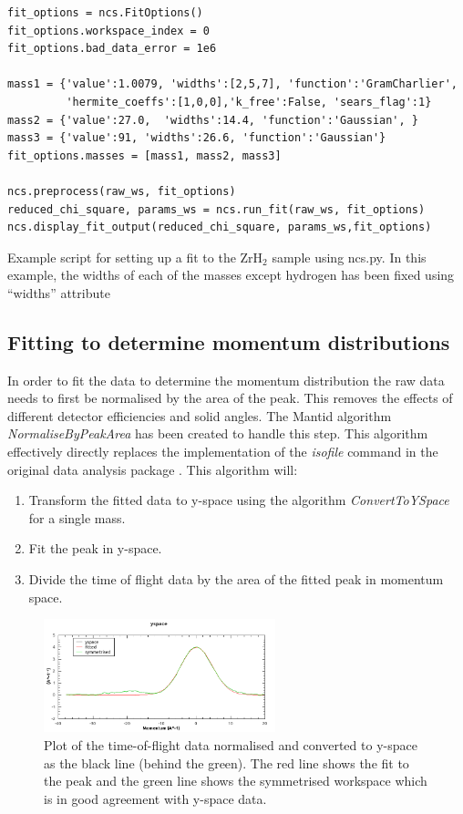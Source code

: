 \documentclass[paper=a4, fontsize=11pt]{scrartcl}	%
\numberwithin{equation}{section}															%
\numberwithin{figure}{section}																%
\numberwithin{table}{section}
\begin{document}
\begin{listing}[H]
\begin{verbatim}
fit_options = ncs.FitOptions()
fit_options.workspace_index = 0
fit_options.bad_data_error = 1e6

mass1 = {'value':1.0079, 'widths':[2,5,7], 'function':'GramCharlier', 
         'hermite_coeffs':[1,0,0],'k_free':False, 'sears_flag':1}
mass2 = {'value':27.0,  'widths':14.4, 'function':'Gaussian', }
mass3 = {'value':91, 'widths':26.6, 'function':'Gaussian'}
fit_options.masses = [mass1, mass2, mass3]

ncs.preprocess(raw_ws, fit_options)
reduced_chi_square, params_ws = ncs.run_fit(raw_ws, fit_options)
ncs.display_fit_output(reduced_chi_square, params_ws,fit_options)
\end{verbatim}
\caption{Example script for setting up a fit to the ZrH$_2$ sample using ncs.py. In this example, the widths of each of the masses except hydrogen has been fixed using ``widths'' attribute}
\label{lst:fit-gram-charlier-setup}
\end{listing}


\subsection{Fitting to determine momentum distributions}
\label{subsec:fitting-momentum-distributions}
In order to fit the data to determine the momentum distribution the raw data needs to first be normalised by the area of the peak. This removes the effects of different detector efficiencies and solid angles. The Mantid algorithm \textit{NormaliseByPeakArea} has been created to handle this step. This algorithm effectively directly replaces the implementation of the \textit{isofile} command in the original data analysis package \cite{mayers2010user}. This algorithm will:

\begin{enumerate}
\item Transform the fitted data to y-space using the algorithm \textit{ConvertToYSpace} for a single mass.
\item Fit the peak in y-space.
\item Divide the time of flight data by the area of the fitted peak in momentum space.
\end{enumerate}

\begin{figure}[H]
\centering
\includegraphics[width=0.6\textwidth]{img/yspace-norm.png}
\caption{Plot of the time-of-flight data normalised and converted to y-space as the black line (behind the green). The red line shows the fit to the peak and the green line shows the symmetrised workspace which is in good agreement with y-space data.}
\label{fig:yspace-norm}
\end{figure}
\end{document}
